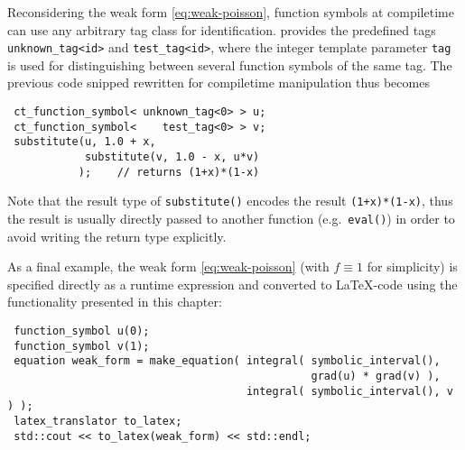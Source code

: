 Reconsidering the weak form \eqref{eq:weak-poisson}, function symbols at compiletime can use any arbitrary tag class for identification.
{\ViennaMath} provides the predefined tags \lstinline|unknown_tag<id>| and \lstinline|test_tag<id>|, where the integer template parameter \lstinline|tag| is used for distinguishing between several function symbols of the same tag. The previous code snipped rewritten for compiletime manipulation thus becomes
\begin{lstlisting}
 ct_function_symbol< unknown_tag<0> > u;
 ct_function_symbol<    test_tag<0> > v;
 substitute(u, 1.0 + x,
            substitute(v, 1.0 - x, u*v)
           );    // returns (1+x)*(1-x)
\end{lstlisting}
Note that the result type of \lstinline|substitute()| encodes the result \lstinline|(1+x)*(1-x)|, thus the result is usually directly passed to another function (e.g.~\lstinline|eval()|) in order to avoid writing the return type explicitly.

As a final example, the weak form \eqref{eq:weak-poisson} (with $f \equiv 1$ for simplicity) is specified directly as a {\ViennaMath} runtime expression and converted to {\LaTeX}-code using the functionality presented in this chapter:
\begin{lstlisting}
 function_symbol u(0);
 function_symbol v(1);
 equation weak_form = make_equation( integral( symbolic_interval(),
                                               grad(u) * grad(v) ),
                                     integral( symbolic_interval(), v ) );
 latex_translator to_latex;
 std::cout << to_latex(weak_form) << std::endl;
\end{lstlisting}





